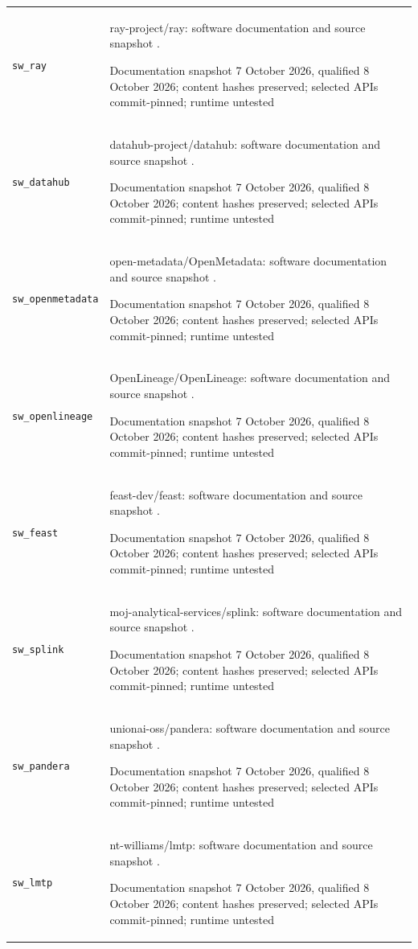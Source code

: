 \begin{longtable}{P{32mm}P{112mm}}
{\scriptsize\texttt{sw\_ray}} & ray-project/ray: software documentation and source snapshot \citep{sw_ray}.\par Documentation snapshot 7 October 2026, qualified 8 October 2026; content hashes preserved; selected APIs commit-pinned; runtime untested\\
{\scriptsize\texttt{sw\_datahub}} & datahub-project/datahub: software documentation and source snapshot \citep{sw_datahub}.\par Documentation snapshot 7 October 2026, qualified 8 October 2026; content hashes preserved; selected APIs commit-pinned; runtime untested\\
{\scriptsize\texttt{sw\_openmetadata}} & open-metadata/OpenMetadata: software documentation and source snapshot \citep{sw_openmetadata}.\par Documentation snapshot 7 October 2026, qualified 8 October 2026; content hashes preserved; selected APIs commit-pinned; runtime untested\\
{\scriptsize\texttt{sw\_openlineage}} & OpenLineage/OpenLineage: software documentation and source snapshot \citep{sw_openlineage}.\par Documentation snapshot 7 October 2026, qualified 8 October 2026; content hashes preserved; selected APIs commit-pinned; runtime untested\\
{\scriptsize\texttt{sw\_feast}} & feast-dev/feast: software documentation and source snapshot \citep{sw_feast}.\par Documentation snapshot 7 October 2026, qualified 8 October 2026; content hashes preserved; selected APIs commit-pinned; runtime untested\\
{\scriptsize\texttt{sw\_splink}} & moj-analytical-services/splink: software documentation and source snapshot \citep{sw_splink}.\par Documentation snapshot 7 October 2026, qualified 8 October 2026; content hashes preserved; selected APIs commit-pinned; runtime untested\\
{\scriptsize\texttt{sw\_pandera}} & unionai-oss/pandera: software documentation and source snapshot \citep{sw_pandera}.\par Documentation snapshot 7 October 2026, qualified 8 October 2026; content hashes preserved; selected APIs commit-pinned; runtime untested\\
{\scriptsize\texttt{sw\_lmtp}} & nt-williams/lmtp: software documentation and source snapshot \citep{sw_lmtp}.\par Documentation snapshot 7 October 2026, qualified 8 October 2026; content hashes preserved; selected APIs commit-pinned; runtime untested\\

\end{longtable}
